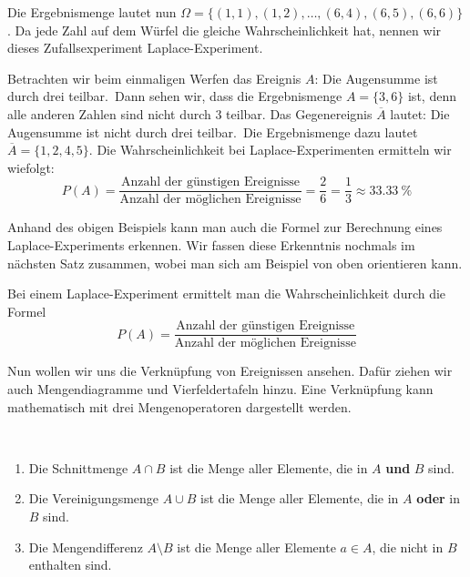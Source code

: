 \documentclass[ngerman, 12pt]{nssheetxea}
\begin{document}
\begin{example}
\begin{center}
\begin{tikzpicture}[grow=right, sloped, scale=0.8]
\end{tikzpicture}
\end{center}
Die Ergebnismenge lautet nun $\Omega = \{(1,1), (1,2), \ldots, (6,4), (6,5), (6,6) \}$. Da jede Zahl auf dem Würfel die gleiche Wahrscheinlichkeit hat, nennen wir dieses Zufallsexperiment Laplace-Experiment. \par
Betrachten wir beim einmaligen Werfen das Ereignis $A$: \glqq Die Augensumme ist durch drei teilbar.\grqq \ Dann sehen wir, dass die Ergebnismenge $A=\{3,6 \}$ ist, denn alle anderen Zahlen sind nicht durch $3$ teilbar. Das Gegenereignis $\overline{A}$ lautet: \glqq Die Augensumme ist nicht durch drei teilbar.\grqq \ Die Ergebnismenge dazu lautet $\overline{A}=\{ 1,2,4,5 \}$. Die Wahrscheinlichkeit bei Laplace-Experimenten ermitteln wir wiefolgt:
\[ P(A)=\dfrac{\text{Anzahl der günstigen Ereignisse}}{\text{Anzahl der möglichen Ereignisse}} = \dfrac{2}{6} = \dfrac{1}{3} \approx \SI{33,33}{\percent} \]
\label{Bsp:ZweimalWürfeln}
\end{example}

Anhand des obigen Beispiels kann man auch die Formel zur Berechnung eines Laplace-Experiments erkennen. Wir fassen diese Erkenntnis nochmals im nächsten Satz zusammen, wobei man sich am Beispiel von oben orientieren kann.

\begin{theorem}
Bei einem Laplace-Experiment ermittelt man die Wahrscheinlichkeit durch die Formel
\[ P(A)=\dfrac{\text{Anzahl der günstigen Ereignisse}}{\text{Anzahl der möglichen Ereignisse}} \]
\end{theorem}

Nun wollen wir uns die Verknüpfung von Ereignissen ansehen. Dafür ziehen wir auch Mengendiagramme und Vierfeldertafeln hinzu. Eine Verknüpfung kann mathematisch mit drei Mengenoperatoren dargestellt werden.

\begin{definition}  \
\begin{enumerate}
\item Die Schnittmenge $A \cap B$ ist die Menge aller Elemente, die in $A$ \textbf{und} $B$ sind.
\item Die Vereinigungsmenge\index{Vereinigungsmenge} $A\cup B$ ist die Menge aller Elemente, die in $A$ \textbf{oder} in $B$ sind.
\item Die Mengendifferenz\index{Mengendifferenz} $A \setminus B$ ist die Menge aller Elemente $a\in A$, die nicht in $B$ enthalten sind.
\end{enumerate}
\end{definition}
\end{document}
